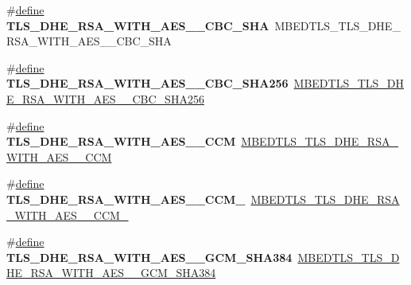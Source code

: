 \begin{DoxyCompactItemize}
\mbox{\label{compat-1_83_8h_a65276549afb8b9be55964d1b16d7299a}} 
\#\hyperlink{structdefine}{define} {\bfseries T\+L\+S\+\_\+\+D\+H\+E\+\_\+\+R\+S\+A\+\_\+\+W\+I\+T\+H\+\_\+\+A\+E\+S\+\_\+\_\+\+C\+B\+C\+\_\+\+S\+HA}~M\+B\+E\+D\+T\+L\+S\+\_\+\+T\+L\+S\+\_\+\+D\+H\+E\+\_\+\+R\+S\+A\+\_\+\+W\+I\+T\+H\+\_\+\+A\+E\+S\+\_\+\_\+\+C\+B\+C\+\_\+\+S\+HA
\item 
\mbox{\label{compat-1_83_8h_a5c8a49fea187f9bc19c43520f22d960b}} 
\#\hyperlink{structdefine}{define} {\bfseries T\+L\+S\+\_\+\+D\+H\+E\+\_\+\+R\+S\+A\+\_\+\+W\+I\+T\+H\+\_\+\+A\+E\+S\+\_\+\_\+\+C\+B\+C\+\_\+\+S\+H\+A256}~\hyperlink{ssl__ciphersuites_8h_a308b9de538829ef3a318ef38f5d7399d}{M\+B\+E\+D\+T\+L\+S\+\_\+\+T\+L\+S\+\_\+\+D\+H\+E\+\_\+\+R\+S\+A\+\_\+\+W\+I\+T\+H\+\_\+\+A\+E\+S\+\_\+\_\+\+C\+B\+C\+\_\+\+S\+H\+A256}
\item 
\mbox{\label{compat-1_83_8h_a3d03a1a519d0b0b81d855bd9e34a320a}} 
\#\hyperlink{structdefine}{define} {\bfseries T\+L\+S\+\_\+\+D\+H\+E\+\_\+\+R\+S\+A\+\_\+\+W\+I\+T\+H\+\_\+\+A\+E\+S\+\_\+\_\+\+C\+CM}~\hyperlink{ssl__ciphersuites_8h_a10937f2f9cdb3fb09a492579ba7e3a81}{M\+B\+E\+D\+T\+L\+S\+\_\+\+T\+L\+S\+\_\+\+D\+H\+E\+\_\+\+R\+S\+A\+\_\+\+W\+I\+T\+H\+\_\+\+A\+E\+S\+\_\+\_\+\+C\+CM}
\item 
\mbox{\label{compat-1_83_8h_a605206196f3cf23bf9f93541e4bfdf34}} 
\#\hyperlink{structdefine}{define} {\bfseries T\+L\+S\+\_\+\+D\+H\+E\+\_\+\+R\+S\+A\+\_\+\+W\+I\+T\+H\+\_\+\+A\+E\+S\+\_\+\_\+\+C\+C\+M\+\_}~\hyperlink{ssl__ciphersuites_8h_a34c988c8893002c5413fd0286b5a8db2}{M\+B\+E\+D\+T\+L\+S\+\_\+\+T\+L\+S\+\_\+\+D\+H\+E\+\_\+\+R\+S\+A\+\_\+\+W\+I\+T\+H\+\_\+\+A\+E\+S\+\_\+\_\+\+C\+C\+M\+\_}
\item 
\mbox{\label{compat-1_83_8h_a35101dd242f84d4c2d1d9d7b0d866a7b}} 
\#\hyperlink{structdefine}{define} {\bfseries T\+L\+S\+\_\+\+D\+H\+E\+\_\+\+R\+S\+A\+\_\+\+W\+I\+T\+H\+\_\+\+A\+E\+S\+\_\+\_\+\+G\+C\+M\+\_\+\+S\+H\+A384}~\hyperlink{ssl__ciphersuites_8h_a24defd8d527f411e6c3ca15edc9f7dfb}{M\+B\+E\+D\+T\+L\+S\+\_\+\+T\+L\+S\+\_\+\+D\+H\+E\+\_\+\+R\+S\+A\+\_\+\+W\+I\+T\+H\+\_\+\+A\+E\+S\+\_\+\_\+\+G\+C\+M\+\_\+\+S\+H\+A384}
\item 
\mbox{\label{compat-1_83_8h_ab63532e90285928744ee177da2a5ab41}} 

\end{DoxyCompactItemize}
